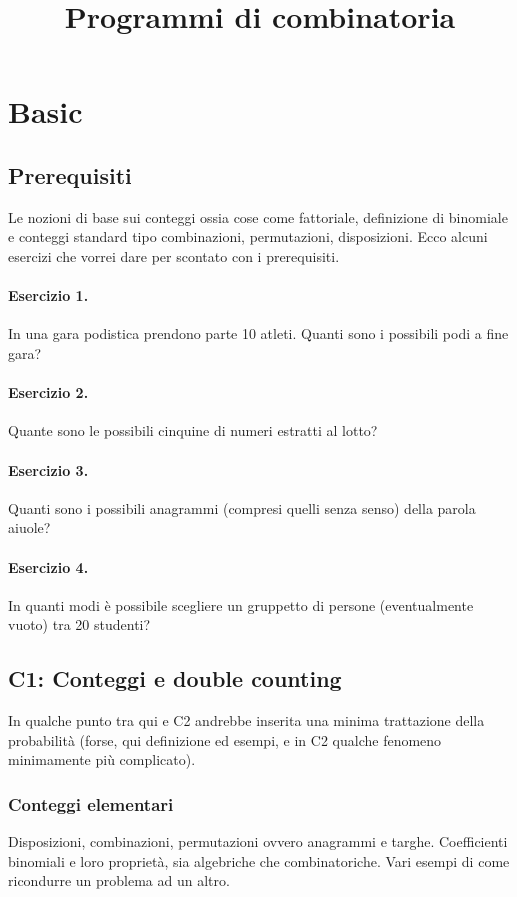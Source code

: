 \documentclass[a4paper,10pt]{article}
\title{Programmi di combinatoria}
\author{}
\begin{document}
\maketitle

\section{Basic}
\subsection{Prerequisiti}
Le nozioni di base sui conteggi ossia cose come fattoriale, definizione di binomiale e conteggi standard tipo combinazioni, permutazioni, disposizioni. Ecco alcuni esercizi che vorrei dare per scontato con i prerequisiti.
\paragraph{Esercizio 1.} In una gara podistica prendono parte 10 atleti. Quanti sono i possibili podi a fine gara?
\paragraph{Esercizio 2.} Quante sono le possibili cinquine di numeri estratti al lotto?
\paragraph{Esercizio 3.} Quanti sono i possibili anagrammi (compresi quelli senza senso) della parola aiuole?
\paragraph{Esercizio 4.} In quanti modi è possibile scegliere un gruppetto di persone
(eventualmente vuoto) tra 20 studenti?


\subsection{C1: Conteggi e double counting}
In qualche punto tra qui e C2 andrebbe inserita una minima trattazione della probabilità (forse, qui definizione ed esempi, e in C2 qualche fenomeno minimamente più complicato).

\subsubsection{Conteggi elementari}
Disposizioni, combinazioni, permutazioni ovvero anagrammi e targhe. Coefficienti binomiali e loro proprietà, sia algebriche che combinatoriche. Vari esempi di come ricondurre un problema ad un altro.
\end{document}
